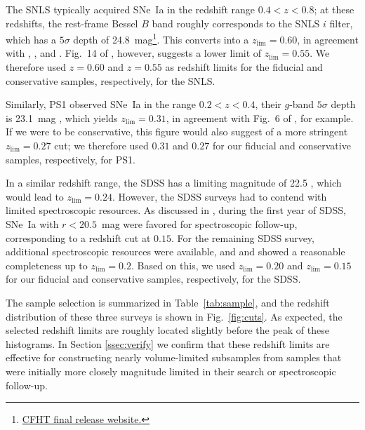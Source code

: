 \documentclass[]{aa}
\begin{document}
The SNLS typically acquired SNe~Ia in the redshift range $0.4<z<0.8$; at these
redshifts, the rest-frame Bessel $B$ band roughly corresponds to the SNLS $i$
filter, which has a $5\sigma$ depth of
24.8~mag\footnote{\href{https://www.cfht.hawaii.edu/Science/CFHTLS/cfhtlsfinalreleaseexecsummary.html}{CFHT
final release website.}}. This converts into a $z_{\lim}=0.60$, in agreement with
\cite{neill2006}, \cite{perrett2010}, and \cite{bazin2011}. Fig.~14 of
\citet[][see their Section~5]{perrett2010}, however, suggests a lower limit of
$z_{\lim}=0.55$. We therefore used $z=0.60$ and $z=0.55$ as redshift
limits for the fiducial and conservative samples, respectively, for the SNLS.

Similarly, PS1 observed SNe~Ia in the range $0.2<z<0.4$, their $g$-band
$5\sigma$ depth is 23.1~mag \citep{rest2014}, which yields $z_{\lim}=0.31$, in
agreement with Fig.~6 of \cite{scolnic2018a}, for example. If we were to be
    conservative, this figure would also suggest of a more stringent
$z_{\lim}=0.27$ cut; we therefore used $0.31$ and $0.27$ for our fiducial and
conservative samples, respectively, for PS1.

In a similar redshift range, the SDSS has a limiting magnitude of 22.5
\citep{dilday2008, sako2008}, which would lead to $z_{\lim}=0.24$. However, the
SDSS surveys had to contend with limited spectroscopic resources. As
discussed in \citet[][Section~2]{kessler2009}, during the first year of SDSS,
SNe~Ia with $r<20.5$~mag were favored for spectroscopic follow-up, corresponding
to a redshift cut at $0.15$. For the remaining SDSS survey, additional
spectroscopic resources were available, and \cite{kessler2009} and
\cite{dilday2008} showed a reasonable completeness up to $z_{\lim}=0.2$.
Based on this, we used $z_{\lim}=0.20$ and $z_{\lim}=0.15$ for our
fiducial and conservative samples, respectively, for the SDSS.

The sample selection is summarized in Table~\ref{tab:sample}, and the redshift
distribution of these three surveys is shown in Fig.~\ref{fig:cuts}. As
expected, the selected redshift limits are roughly located slightly
    before the peak of these histograms. In Section \ref{ssec:verify} we
confirm that these redshift limits are effective for constructing nearly
volume-limited subsamples from samples that were initially more closely
magnitude limited in their search or spectroscopic follow-up.
\end{document}
